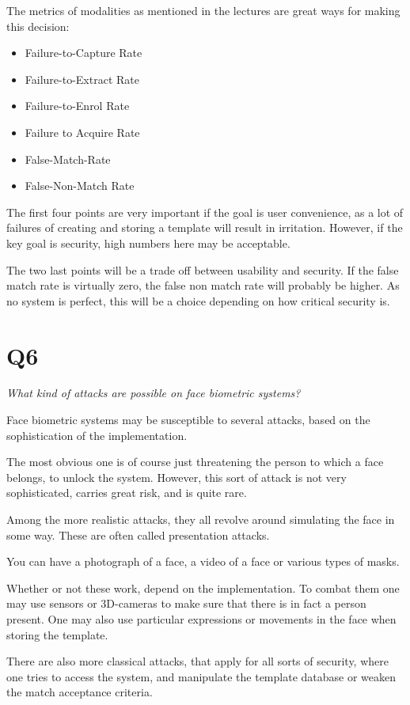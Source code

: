 \documentclass{article}
\begin{document}
The metrics of modalities as mentioned in the lectures are great ways for making this decision:

\begin{itemize}
  \item{Failure-to-Capture Rate}
  \item{Failure-to-Extract Rate}
  \item{Failure-to-Enrol Rate}
  \item{Failure to Acquire Rate}
  \item{False-Match-Rate}
  \item{False-Non-Match Rate}
\end{itemize}
The first four points are very important if the goal is user convenience, as a lot of failures of creating and storing a template will result in irritation. However, if the key goal is security, high numbers here may be acceptable.

The two last points will be a trade off between usability and security. If the false match rate is virtually zero, the false non match rate will probably be higher. As no system is perfect, this will be a choice depending on how critical security is.


\newpage
\section{Q6}
\begin{tcolorbox}
  \textit{What kind of attacks are possible on face biometric systems?}
\end{tcolorbox}

Face biometric systems may be susceptible to several attacks, based on the sophistication of the implementation.

The most obvious one is of course just threatening the person to which a face belongs, to unlock the system. However, this sort of attack is not very sophisticated, carries great risk, and is quite rare.

Among the more realistic attacks, they all revolve around simulating the face in some way. These are often called presentation attacks.

You can have a photograph of a face, a video of a face or various types of masks.

Whether or not these work, depend on the implementation. To combat them one may use sensors or 3D-cameras to make sure that there is in fact a person present. One may also use particular expressions or movements in the face when storing the template.

There are also more classical attacks, that apply for all sorts of security, where one tries to access the system, and manipulate the template database or weaken the match acceptance criteria.

\newpage

\nocite{*}



\end{document}
